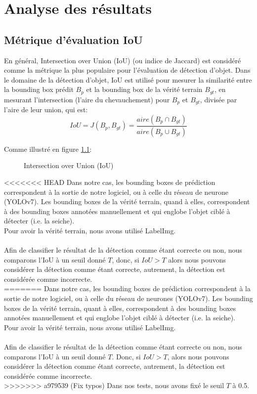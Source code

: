 \chapter{Analyse des résultats}

\section{Métrique d'évaluation IoU}
En général, Intersection over Union (IoU) (ou indice de Jaccard) est considéré comme la métrique la plus populaire pour l'évaluation de détection d'objet. Dans le domaine de la détection d'objet, IoU est utilisé pour mesurer la similarité entre la bounding box prédit $B_{p}$ et la bounding box de la vérité terrain $B_{gt}$, en mesurant l'intersection (l'aire du chevauchement) pour $B_{p}$ et $B_{gt}$, divisée par l'aire de leur union, qui est:
$$IoU=J(B_{p}, B_{gt})=\frac{aire(B_{p} \cap B_{gt})}{aire(B_{p} \cup B_{gt})}$$
 
Comme illustré en figure \ref{fig:iou_example}:

\begin{figure}[!htbp]
\center
\caption{Intersection over Union (IoU)}
\label{fig:iou_example}
\end{figure}
\FloatBarrier

<<<<<<< HEAD
Dans notre cas, les bounding boxes de prédiction correspondent à la sortie de notre logiciel, ou à celle du réseau de neurone (YOLOv7). Les bounding boxes de la vérité terrain, quand à elles, correspondent à des bounding boxes annotées manuellement et qui englobe l'objet ciblé à détecter (i.e. la seiche).\\
Pour avoir la vérité terrain, nous avons utilisé LabelImg.\\
\\
Afin de classifier le résultat de la détection comme étant correcte ou non, nous comparons l'IoU à un seuil donné $T$, donc, si $IoU > T$ alors nous pouvons considérer la détection comme étant correcte, autrement, la détection est considérée comme incorrecte.\\
=======
Dans notre cas, les bounding boxes de prédiction correspondent à la sortie de notre logiciel, ou à celle du réseau de neurones (YOLOv7). Les bounding boxes de la vérité terrain, quant à elles, correspondent à des bounding boxes annotées manuellement et qui englobe l'objet ciblé à détecter (i.e. la seiche).\\
Pour avoir la vérité terrain, nous avons utilisé LabelImg.\\
\\
Afin de classifier le résultat de la détection comme étant correcte ou non, nous comparons l'IoU à un seuil donné $T$. Donc, si $IoU > T$, alors nous pouvons considérer la détection comme étant correcte, autrement, la détection est considérée comme incorrecte.\\
>>>>>>> a979539 (Fix typos)
Dans nos tests, nous avons fixé le seuil $T$ à 0.5.




